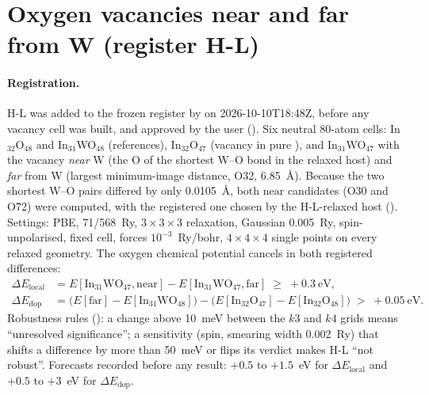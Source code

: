 \section{Oxygen vacancies near and far from W (register H-L)}
\label{sec:mono-w-hl}

\paragraph{Registration.} H-L was added to the frozen register by  on 2026-10-10T18:48Z, before any vacancy
cell was built, and approved by the user (). Six neutral 80-atom cells: In$_{32}$O$_{48}$ and
In$_{31}$WO$_{48}$ (references), In$_{32}$O$_{47}$ (vacancy in pure \InO{}), and In$_{31}$WO$_{47}$ with the vacancy
\emph{near} W (the O of the shortest W--O bond in the relaxed host) and \emph{far} from W (largest minimum-image distance,
O32, 6.85~\AA). Because the two shortest W--O pairs differed by only 0.0105~\AA, both near candidates (O30 and O72) were
computed, with the registered one chosen by the H-L-relaxed host (). Settings: PBE, 71/568~Ry, $3\times3\times3$
relaxation, Gaussian 0.005~Ry, spin-unpolarised, fixed cell, forces $10^{-3}$~Ry/bohr, $4\times4\times4$ single points on
every relaxed geometry. The oxygen chemical potential cancels in both registered differences:
\begin{align}
\Delta E_{\mathrm{local}} &= E[\mathrm{In_{31}WO_{47}},\mathrm{near}] - E[\mathrm{In_{31}WO_{47}},\mathrm{far}]
 \;\ge\; +0.3~\mathrm{eV}, \label{eq:mono-w-elocal}\\
\Delta E_{\mathrm{dop}} &= \big(E[\mathrm{far}] - E[\mathrm{In_{31}WO_{48}}]\big) - \big(E[\mathrm{In_{32}O_{47}}] -
 E[\mathrm{In_{32}O_{48}}]\big) \;>\; +0.05~\mathrm{eV}. \label{eq:mono-w-edop}
\end{align}
Robustness rules (): a change above 10~meV between the $k3$ and $k4$ grids means ``unresolved significance''; a
sensitivity (spin, smearing width 0.002~Ry) that shifts a difference by more than 50~meV or flips its verdict makes H-L
``not robust''. Forecasts recorded before any result: $+0.5$ to $+1.5$~eV for $\Delta E_{\mathrm{local}}$ and $+0.5$ to
$+3$~eV for $\Delta E_{\mathrm{dop}}$.

